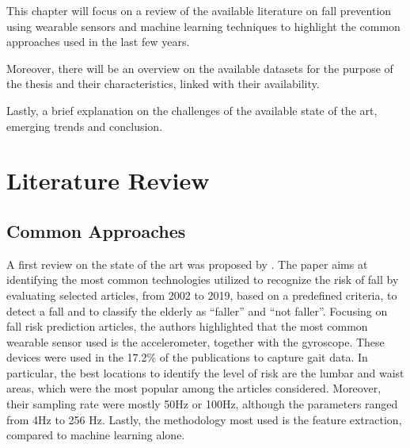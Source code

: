 This chapter will focus on a review of the available literature on fall prevention using wearable sensors and machine learning techniques to highlight the common approaches used in the last few years.

Moreover, there will be an overview on the available datasets for the purpose of the thesis and their characteristics, linked with their availability.

Lastly, a brief explanation on the challenges of the available state of the art, emerging trends and conclusion.
\section{Literature Review}
\subsection{Common Approaches}
A first review on the state of the art was proposed by \cite{FallRiskAssessment_WearableSensors_SystematicReview}. 
The paper aims at identifying the most common technologies utilized to recognize the risk of fall by evaluating selected articles, 
from 2002 to 2019, based on a predefined criteria, to detect a fall and to classify the elderly as \enquote{faller} and \enquote{not faller}.  
Focusing on fall risk prediction articles, the authors highlighted that the most common wearable sensor used is the accelerometer, together with the gyroscope. These devices were used in the 17.2\% of the publications to capture gait data. In particular, the best locations to identify the level of risk are the lumbar and waist areas, which were the most popular among the articles considered. Moreover, their sampling rate were mostly 50Hz or 100Hz, although the parameters ranged from 4Hz to 256 Hz. 
Lastly, the methodology most used is the feature extraction, compared to machine learning alone. 


